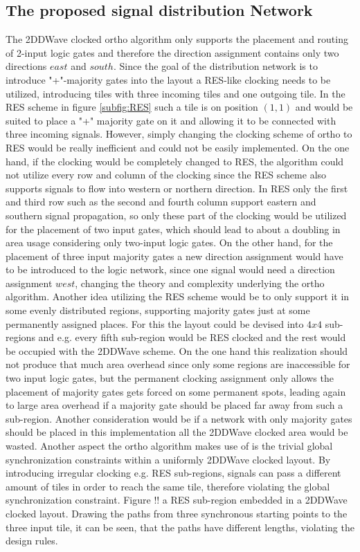 \subsection{The proposed signal distribution Network}
The 2DDWave clocked ortho algorithm only supports the placement and routing of 2-input logic gates and therefore the direction assignment contains only two directions $east$ and $south$. Since the goal of the distribution network is to introduce "+"-majority gates into the layout a RES-like clocking needs to be utilized, introducing tiles with three incoming tiles and one outgoing tile. In the RES scheme in figure \ref{subfig:RES} such a tile is on position $(1, 1)$ and would be suited to place a "+" majority gate on it and allowing it to be connected with three incoming signals. However, simply changing the clocking scheme of ortho to RES would be really inefficient and could not be easily implemented. On the one hand, if the clocking would be completely changed to RES, the algorithm could not utilize every row and column of the clocking since the RES scheme also supports signals to flow into western or northern direction. In RES only the first and third row such as the second and fourth column support eastern and southern signal propagation, so only these part of the clocking would be utilized for the placement of two input gates, which should lead to about a doubling in area usage considering only two-input logic gates. On the other hand, for the placement of three input majority gates a new direction assignment would have to be introduced to the logic network, since one signal would need a direction assignment $west$, changing the theory and complexity underlying the ortho algorithm. Another idea utilizing the RES scheme would be to only support it in some evenly distributed regions, supporting majority gates just at some permanently assigned places. For this the layout could be devised into $4x4$ sub-regions and e.g. every fifth sub-region would be RES clocked and the rest would be occupied with the 2DDWave scheme. On the one hand this realization should not produce that much area overhead since only some regions are inaccessible for two input logic gates, but the permanent clocking assignment only allows the placement of majority gates gets forced on some permanent spots, leading again to large area overhead if a majority gate should be placed far away from such a sub-region. Another consideration would be if a network with only majority gates should be placed in this implementation all the 2DDWave clocked area would be wasted. Another aspect the ortho algorithm makes use of is the trivial global synchronization constraints within a uniformly 2DDWave clocked layout. By introducing irregular clocking e.g. RES sub-regions, signals can pass a different amount of tiles in order to reach the same tile, therefore violating the global synchronization constraint. Figure !! a RES sub-region embedded in a 2DDWave clocked layout. Drawing the paths from three synchronous starting points to the three input tile, it can be seen, that the paths have different lengths, violating the design rules.


